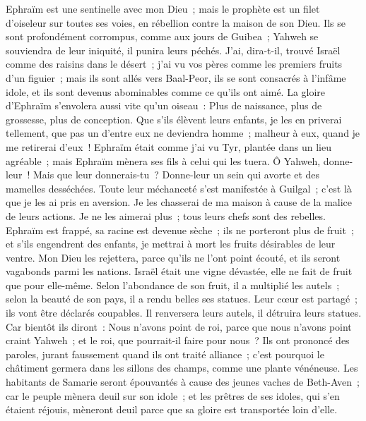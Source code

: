 \begin{multicols}{2}
Ephraïm est une sentinelle avec mon Dieu~; mais le prophète est un filet d'oiseleur sur toutes ses voies, en rébellion contre la maison de son Dieu.
Ils se sont profondément corrompus, comme aux jours de Guibea~; Yahweh se souviendra de leur iniquité, il punira leurs péchés.
J'ai, dira-t-il, trouvé Israël comme des raisins dans le désert~; j'ai vu vos pères comme les premiers fruits d'un figuier~; mais ils sont allés vers Baal-Peor, ils se sont consacrés à l'infâme idole, et ils sont devenus abominables comme ce qu'ils ont aimé.
La gloire d'Ephraïm s'envolera aussi vite qu'un oiseau~: Plus de naissance, plus de grossesse, plus de conception.
Que s'ils élèvent leurs enfants, je les en priverai tellement, que pas un d'entre eux ne deviendra homme~; malheur à eux, quand je me retirerai d'eux~!
Ephraïm était comme j'ai vu Tyr, plantée dans un lieu agréable~; mais Ephraïm mènera ses fils à celui qui les tuera.
Ô Yahweh, donne-leur~! Mais que leur donnerais-tu~? Donne-leur un sein qui avorte et des mamelles desséchées.
Toute leur méchanceté s'est manifestée à Guilgal~; c'est là que je les ai pris en aversion. Je les chasserai de ma maison à cause de la malice de leurs actions. Je ne les aimerai plus~; tous leurs chefs sont des rebelles.
Ephraïm est frappé, sa racine est devenue sèche~; ils ne porteront plus de fruit~; et s'ils engendrent des enfants, je mettrai à mort les fruits désirables de leur ventre.
Mon Dieu les rejettera, parce qu'ils ne l'ont point écouté, et ils seront vagabonds parmi les nations.
\VerseOne{}Israël était une vigne dévastée, elle ne fait de fruit que pour elle-même. Selon l'abondance de son fruit, il a multiplié les autels~; selon la beauté de son pays, il a rendu belles ses statues.
Leur cœur est partagé~; ils vont être déclarés coupables. Il renversera leurs autels, il détruira leurs statues.
Car bientôt ils diront~: Nous n'avons point de roi, parce que nous n'avons point craint Yahweh~; et le roi, que pourrait-il faire pour nous~?
Ils ont prononcé des paroles, jurant faussement quand ils ont traité alliance~; c'est pourquoi le châtiment germera dans les sillons des champs, comme une plante vénéneuse.
Les habitants de Samarie seront épouvantés à cause des jeunes vaches de Beth-Aven~; car le peuple mènera deuil sur son idole~; et les prêtres de ses idoles, qui s'en étaient réjouis, mèneront deuil parce que sa gloire est transportée loin d'elle.

\end{multicols}
